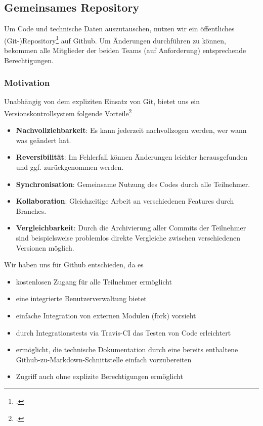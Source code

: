 \subsection{Gemeinsames Repository}
Um Code und technische Daten auszutauschen, nutzen wir ein öffentliches (Git-)Repository\footcite{githubRepo} auf Github. Um Änderungen durchführen zu können, bekommen alle Mitglieder der beiden Teams (auf Anforderung) entsprechende Berechtigungen.

\subsubsection{Motivation}
Unabhängig von dem expliziten Einsatz von Git, bietet uns ein Versionskontrollsystem folgende Vorteile\footcite{stackoverflowVersionControl}

\begin{itemize}
\item \textbf{Nachvollziehbarkeit}: Es kann jederzeit nachvollzogen werden, wer wann was geändert hat.
\item \textbf{Reversibilität}: Im Fehlerfall können Änderungen leichter herausgefunden und ggf. zurückgenommen werden.
\item \textbf{Synchronisation}: Gemeinsame Nutzung des Codes durch alle Teilnehmer.
\item \textbf{Kollaboration}: Gleichzeitige Arbeit an verschiedenen Features durch Branches.
\item \textbf{Vergleichbarkeit}: Durch die Archivierung aller Commits der Teilnehmer sind beispielsweise problemlos direkte Vergleiche zwischen verschiedenen Versionen möglich.
\end{itemize}

Wir haben uns für Github entschieden, da es
\begin{itemize}
\item kostenlosen Zugang für alle Teilnehmer ermöglicht
\item eine integrierte Benutzerverwaltung bietet
\item einfache Integration von externen Modulen (fork) vorsieht
\item durch Integrationstests via Travis-CI das Testen von Code erleichtert
\item ermöglicht, die technische Dokumentation durch eine bereits enthaltene Github-zu-Markdown-Schnittstelle einfach vorzubereiten
\item Zugriff auch ohne explizite Berechtigungen ermöglicht
\end{itemize}

